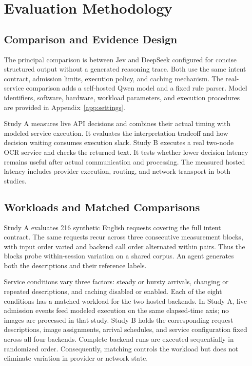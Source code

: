 \section{Evaluation Methodology}
\label{sec:design}
\subsection{Comparison and Evidence Design}
The principal comparison is between Jev and DeepSeek configured for concise
structured output without a generated reasoning trace. Both use the same
intent contract, admission limits, execution policy, and caching mechanism.
The real-service comparison adds a self-hosted Qwen model and a fixed rule
parser. Model identifiers, software,
hardware, workload parameters, and execution procedures are provided in
Appendix~\ref{app:settings}.

Study A measures live API decisions and
combines their actual timing with modeled service execution. It evaluates
the interpretation tradeoff and how decision waiting consumes execution
slack. Study B executes a real two-node OCR service and checks the returned
text. It tests whether lower decision latency remains useful after actual
communication and processing. The measured hosted latency includes provider
execution, routing, and network transport in both studies.

\subsection{Workloads and Matched Comparisons}
Study A evaluates 216 synthetic English requests covering the full intent
contract. The same requests recur across three consecutive measurement
blocks, with input order varied and backend call order alternated within
pairs. Thus the blocks probe within-session variation on a shared corpus.
An agent generates both the descriptions and their reference labels.

Service conditions vary three factors: steady or bursty arrivals, changing
or repeated descriptions, and caching disabled or enabled. Each of the eight
conditions has a matched workload for the two hosted backends. In Study A,
live admission events feed modeled execution on the same elapsed-time axis;
no images are processed in that study. Study B holds the corresponding
request descriptions, image assignments, arrival schedules, and service
configuration fixed across all four backends. Complete backend runs are
executed sequentially in randomized order. Consequently, matching controls
the workload but does not eliminate variation in provider or network state.

